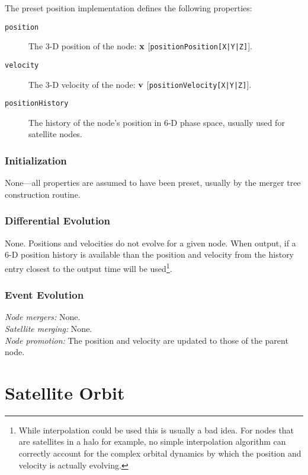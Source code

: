 The preset position implementation defines the following properties:
\begin{description}
 \item [{\tt position}] The 3-D position of the node: ${\bf x}$ [{\tt positionPosition[X|Y|Z]}].
 \item [{\tt velocity}] The 3-D velocity of the node: ${\bf v}$ [{\tt positionVelocity[X|Y|Z]}].
 \item [{\tt positionHistory}] The history of the node's position in 6-D phase space, usually used for satellite nodes.
\end{description}

\subsubsection{Initialization}

None---all properties are assumed to have been preset, usually by the merger tree construction routine.

\subsubsection{Differential Evolution}

None. Positions and velocities do not evolve for a given node. When output, if a 6-D position history is available than the position and velocity from the history entry closest to the output time will be used\footnote{While interpolation could be used this is usually a bad idea. For nodes that are satellites in a halo for example, no simple interpolation algorithm can correctly account for the complex orbital dynamics by which the position and velocity is actually evolving.}.

\subsubsection{Event Evolution}

\noindent\emph{Node mergers:} None.\\

\noindent\emph{Satellite merging:} None.\\

\noindent\emph{Node promotion:} The position and velocity are updated to those of the parent node.\\

\section{Satellite Orbit}


